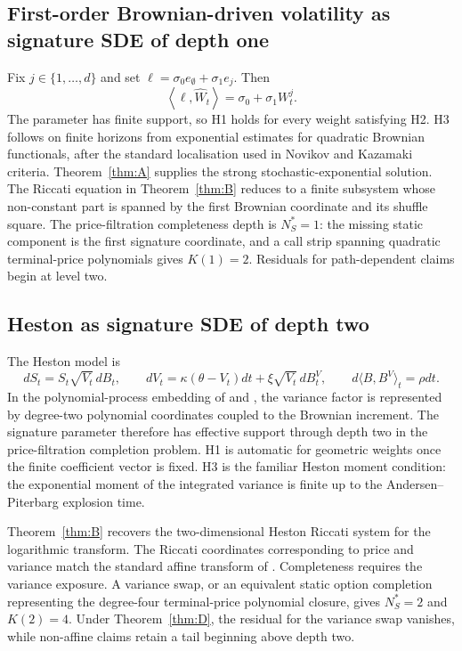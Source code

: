 \documentclass[11pt,oneside]{article}
\theoremstyle{plain}
\theoremstyle{definition}
\theoremstyle{remark}
\newcommand{\cW}{\widehat W}
\newcommand{\inner}[2]{\left\langle #1,#2\right\rangle}
\begin{document}
\subsection{First-order Brownian-driven volatility as signature SDE of depth one}
Fix $j\in\{1,\ldots,d\}$ and set $\ell=\sigma_0e_\emptyset+\sigma_1e_j$. Then
\[
\inner{\ell}{\cW_t}=\sigma_0+\sigma_1W_t^j.
\]
The parameter has finite support, so H1 holds for every weight satisfying H2. H3 follows on finite horizons from exponential estimates for quadratic Brownian functionals, after the standard localisation used in Novikov and Kazamaki criteria. Theorem~\ref{thm:A} supplies the strong stochastic-exponential solution. The Riccati equation in Theorem~\ref{thm:B} reduces to a finite subsystem whose non-constant part is spanned by the first Brownian coordinate and its shuffle square. The price-filtration completeness depth is $N_S^\ast=1$: the missing static component is the first signature coordinate, and a call strip spanning quadratic terminal-price polynomials gives $K(1)=2$. Residuals for path-dependent claims begin at level two.

\subsection{Heston as signature SDE of depth two}\label{subsec:heston}
The Heston model is
\[
dS_t=S_t\sqrt{V_t}\,dB_t,
\qquad dV_t=\kappa(\theta-V_t)dt+\xi\sqrt{V_t}\,dB_t^V,
\qquad d\langle B,B^V\rangle_t=\rho dt.
\]
In the polynomial-process embedding of \citet{CuchieroKellerResselTeichmann2012} and \citet{FilipovicLarsson2016}, the variance factor is represented by degree-two polynomial coordinates coupled to the Brownian increment. The signature parameter therefore has effective support through depth two in the price-filtration completion problem. H1 is automatic for geometric weights once the finite coefficient vector is fixed. H3 is the familiar Heston moment condition: the exponential moment of the integrated variance is finite up to the Andersen--Piterbarg explosion time.

Theorem~\ref{thm:B} recovers the two-dimensional Heston Riccati system for the logarithmic transform. The Riccati coordinates corresponding to price and variance match the standard affine transform of \citet{Heston1993}. Completeness requires the variance exposure. A variance swap, or an equivalent static option completion representing the degree-four terminal-price polynomial closure, gives $N_S^\ast=2$ and $K(2)=4$. Under Theorem~\ref{thm:D}, the residual for the variance swap vanishes, while non-affine claims retain a tail beginning above depth two.
\end{document}
